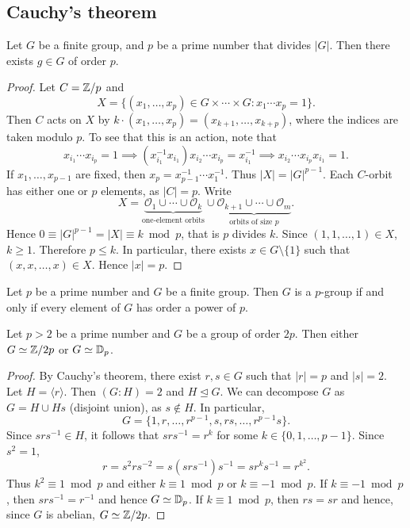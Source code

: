\subsection{Cauchy's theorem}

\begin{theorem}[Cauchy]
\label{thm:Cauchy}
Let $G$ be a finite group, and $p$ be a prime number
that divides $|G|$. 
Then there exists $g\in G$ of order $p$.
\end{theorem}

\begin{proof}
Let $C=\mathbb{Z}/p$ and 
\[
X=\{(x_1,\dots,x_p)\in G\times\cdots\times G:x_1\cdots x_p=1\}.
\]
Then $C$ acts on $X$ by $k\cdot (x_1,\dots,x_p)=(x_{k+1},\dots,x_{k+p})$, where the indices are taken modulo $p$. To see that
this is an action, note that 
\[
x_{i_1}\cdots x_{i_p}=1
\implies (x_{i_1}^{-1}x_{i_1})x_{i_2}\cdots x_{i_p}=x_{i_1}^{-1}
\implies x_{i_2}\cdots x_{i_p}x_{i_1}=1.
\]
If $x_1,\dots,x_{p-1}$ are fixed, then 
$x_p=x_{p-1}^{-1}\cdots x_{1}^{-1}$. Thus $|X|=|G|^{p-1}$. Each $C$-orbit
has either one or $p$ elements, as $|C|=p$. Write
\[
X=\underbrace{\mathcal{O}_1\cup\cdots\cup \mathcal{O}_k}_{\text{one-element orbits}}\cup\underbrace{\mathcal{O}_{k+1}\cup\cdots\cup\mathcal{O}_m}_{\text{orbits of size $p$}}.
\]
Hence $0\equiv |G|^{p-1}=|X|\equiv k\bmod p$, that is $p$ divides $k$. Since $(1,1,\dots,1)\in X$, $k\geq 1$. Therefore $p\leq k$. In particular,
there exists $x\in G\setminus\{1\}$ such that $(x,x,\dots,x)\in X$. Hence $|x|=p$.
\end{proof}

\begin{exercise}
\label{xca:p_groups}
    Let $p$ be a prime number and $G$ be a finite group. 
    Then $G$ is a $p$-group if and only if 
    every element of $G$ has order a power of $p$. 
\end{exercise}

\begin{corollary}
    Let $p>2$ be a prime number 
    and $G$ be a group of order $2p$. 
    Then either $G\simeq\mathbb{Z}/2p$ or $G\simeq\mathbb{D}_p$.
\end{corollary}

\begin{proof}
    By Cauchy's theorem, there exist $r,s\in G$ such that
    $|r|=p$ and $|s|=2$. Let $H=\langle r\rangle$. Then
    $(G:H)=2$ and $H\unlhd G$. We can decompose $G$ as 
    $G=H\cup Hs$ (disjoint union), 
    as $s\not\in H$. In particular, 
\[
G=\{1,r,\dots,r^{p-1},s,rs,\dots,r^{p-1}s\}.
\]
Since $srs^{-1}\in H$, it follows that $srs^{-1}=r^k$ for some
$k\in\{0,1,\dots,p-1\}$. Since $s^2=1$,
\[
r=s^2rs^{-2}=s(srs^{-1})s^{-1}=sr^ks^{-1}=r^{k^2}.
\]
Thus $k^2\equiv 1\bmod p$ and either 
$k\equiv 1\bmod p$ or $k\equiv-1\bmod p$. 
If $k\equiv -1\bmod p$, then $srs^{-1}=r^{-1}$ and hence $G\simeq\mathbb{D}_p$.
If $k\equiv 1\bmod p$, then $rs=sr$ and hence, since $G$ is abelian, $G\simeq\mathbb{Z}/{2p}$.
\end{proof}

